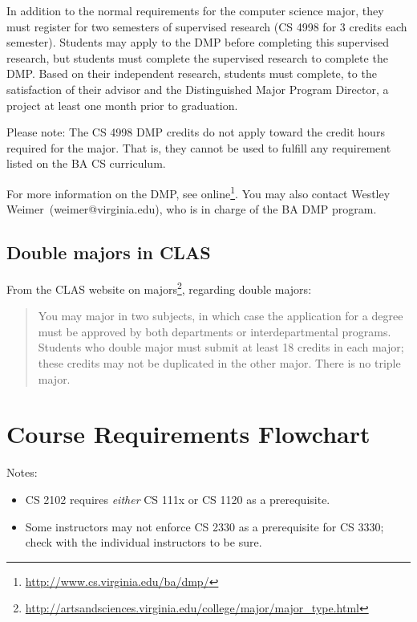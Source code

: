 \documentclass[10pt,letter]{book}
\makeatletter
\newenvironment{itemlist}{
\begin{itemize}
\setlength{\itemsep}{0pt}
\setlength{\parskip}{0pt}}
{\end{itemize}}
\newcommand{\badmp}{Westley Weimer}
\newcommand{\badmpemail}{weimer@virginia.edu}
\newcommand{\mysection}[1]{\section{#1}\renewcommand{\rightmark}{#1}}
\newcommand{\myurl}[1]{\footnote{\scriptsize\url{#1}}}
\makeatother
\begin{document}
In addition to the normal requirements for the computer science major,
they must register for two semesters of supervised research (CS 4998
for 3 credits each semester). Students may apply to the DMP before
completing this supervised research, but students must complete the
supervised research to complete the DMP. Based on their independent
research, students must complete, to the satisfaction of their advisor
and the Distinguished Major Program Director, a project at least one
month prior to graduation.

Please note: The CS 4998 DMP credits do not apply toward the credit
hours required for the major. That is, they cannot be used to fulfill
any requirement listed on the BA CS curriculum.

For more information on the DMP, see
online\myurl{http://www.cs.virginia.edu/ba/dmp/}. You may
also contact \badmp\ (\badmpemail), who is in charge of the BA DMP
program.

\subsection{Double majors in CLAS}

From the CLAS website on majors\myurl{http://artsandsciences.virginia.edu/college/major/major_type.html},
regarding double majors:

\begin{quotation}
\noindent You may major in two subjects, in which case the application
for a degree must be approved by both departments or inter\-departmental
programs. Students who double major must submit at least 18 credits in
each major; these credits may not be duplicated in the other
major. There is no triple major.
\end{quotation}


\clearpage

\mysection{Course Requirements Flowchart}

\begin{figure}[h!]
\end{figure}

\noindent Notes:

\begin{itemlist}
\item CS 2102 requires {\em either} CS 111x or CS 1120 as a
  prerequisite.
\item Some instructors may not enforce CS 2330 as a prerequisite for
  CS 3330; check with the individual instructors to be sure.
\end{itemlist}
\end{document}
